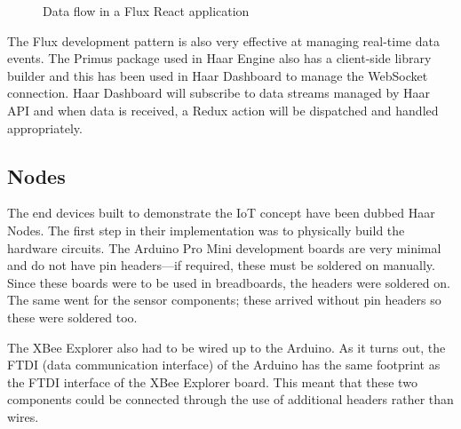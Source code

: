       \begin{figure}
        \centering
      \caption{Data flow in a Flux React application}\label{figure:flux-flow}
    \end{figure}

    The Flux development pattern is also very effective at managing real-time data events. The Primus package used in Haar Engine also has a client-side library builder and this has been used in Haar Dashboard to manage the WebSocket connection. Haar Dashboard will subscribe to data streams managed by Haar API and when data is received, a Redux action will be dispatched and handled appropriately.

    \subsection{Nodes}
      The end devices built to demonstrate the IoT concept have been dubbed Haar Nodes. The first step in their implementation was to physically build the hardware circuits. The Arduino Pro Mini development boards are very minimal and do not have pin headers---if required, these must be soldered on manually. Since these boards were to be used in breadboards, the headers were soldered on. The same went for the sensor components; these arrived without pin headers so these were soldered too.

      The XBee Explorer also had to be wired up to the Arduino. As it turns out, the FTDI (data communication interface) of the Arduino has the same footprint as the FTDI interface of the XBee Explorer board. This meant that these two components could be connected through the use of additional headers rather than wires. 

